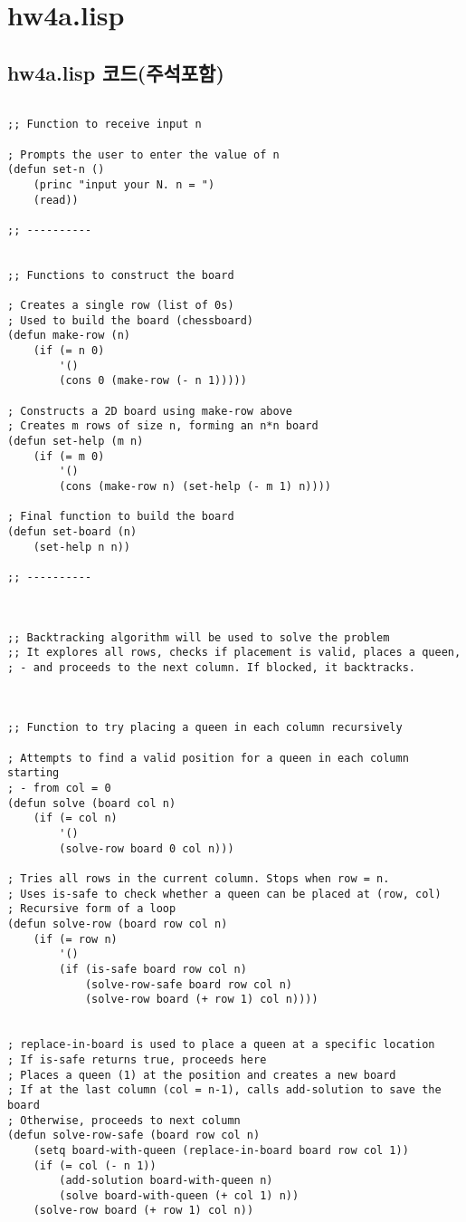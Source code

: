 \documentclass{article}
\begin{document}
\section{hw4a.lisp}
\subsection{hw4a.lisp 코드(주석포함)}
\begin{lstlisting}

;; Function to receive input n

; Prompts the user to enter the value of n
(defun set-n ()
    (princ "input your N. n = ")
    (read))

;; ----------


;; Functions to construct the board

; Creates a single row (list of 0s)
; Used to build the board (chessboard)
(defun make-row (n)
    (if (= n 0)
        '()
        (cons 0 (make-row (- n 1)))))

; Constructs a 2D board using make-row above
; Creates m rows of size n, forming an n*n board
(defun set-help (m n)
	(if (= m 0)
		'()
		(cons (make-row n) (set-help (- m 1) n))))

; Final function to build the board
(defun set-board (n)
	(set-help n n))

;; ----------



;; Backtracking algorithm will be used to solve the problem
;; It explores all rows, checks if placement is valid, places a queen, 
; - and proceeds to the next column. If blocked, it backtracks.



;; Function to try placing a queen in each column recursively

; Attempts to find a valid position for a queen in each column starting 
; - from col = 0
(defun solve (board col n)
	(if (= col n)
		'()
		(solve-row board 0 col n)))

; Tries all rows in the current column. Stops when row = n.
; Uses is-safe to check whether a queen can be placed at (row, col)
; Recursive form of a loop
(defun solve-row (board row col n)
	(if (= row n)
		'()
		(if (is-safe board row col n)
			(solve-row-safe board row col n)
			(solve-row board (+ row 1) col n))))


; replace-in-board is used to place a queen at a specific location
; If is-safe returns true, proceeds here
; Places a queen (1) at the position and creates a new board
; If at the last column (col = n-1), calls add-solution to save the board
; Otherwise, proceeds to next column
(defun solve-row-safe (board row col n)
	(setq board-with-queen (replace-in-board board row col 1))
	(if (= col (- n 1))
		(add-solution board-with-queen n)
		(solve board-with-queen (+ col 1) n))
	(solve-row board (+ row 1) col n))




\end{lstlisting}
\end{document}
